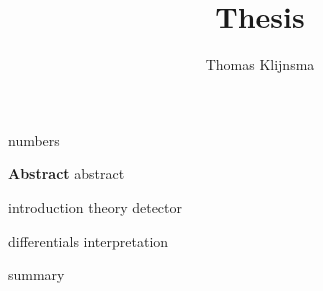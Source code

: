 \documentclass[draftmode]{main}
\begin{document}
\title{Thesis}
\author{Thomas Klijnsma}
\maketitle

{numbers}

\textbf{Abstract}
{abstract}

\tableofcontents

{introduction}
{theory}
{detector}

{differentials}
{interpretation}

{summary}




\end{document}
